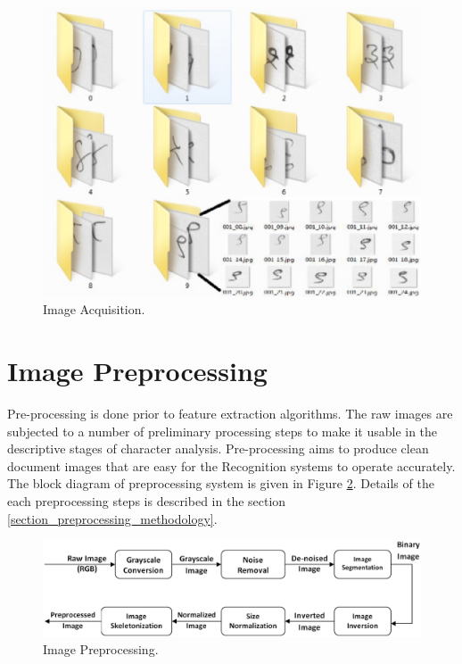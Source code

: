 \pagebreak
\begin{figure}[h]
\centering
\includegraphics[scale=0.5]{figures/system_overview/folders_files.eps}
\caption{Image Acquisition.}
\label{figure_image_acquisition}
\end{figure}

\newpage
\section{Image Preprocessing} \label{section_image_preprocessing}
Pre-processing is done prior to feature extraction algorithms. The raw images are subjected to a number of preliminary processing steps to make it usable in the descriptive stages of character analysis. Pre-processing aims to produce clean document images that are easy for the Recognition systems to operate accurately. The block diagram of preprocessing system is given in Figure \ref{figure_image_preprocessing}. Details of the each preprocessing steps is described in the section \ref{section_preprocessing_methodology}.
\begin{figure}[h]
\centering
\includegraphics[width=\linewidth]{figures/system_overview/image_preprocessing.eps}
\caption{Image Preprocessing.}
\label{figure_image_preprocessing}
\end{figure}


